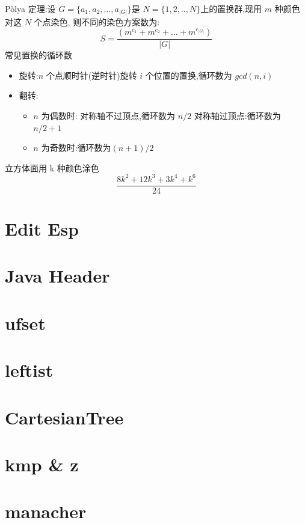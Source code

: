 \documentclass[
	10pt,
	twocolumn,
	a4paper,
]{article}
\begin{document}
Pòlya 定理:设 $G=\{a_1, a_2, ..., a_{|G|}\}$是 $N=\{1,2,..,N\}$上的置换群,现用 $m$ 种颜色对这 $N$ 个点染色, 则不同的染色方案数为:
$$S = \frac{(m^{c_1}+m^{c_2}+ \ldots + m^{c_{|G|}})}{|G|}$$
常见置换的循环数
\begin{itemize}
	\item 旋转:$n$ 个点顺时针(逆时针)旋转 $i$ 个位置的置换,循环数为 $gcd(n, i)$ 
	\item 翻转:
	\begin{itemize}
		\item $n$ 为偶数时: 对称轴不过顶点,循环数为 $n/2$ 对称轴过顶点:循环数为 $n/2+1$
		\item $n$ 为奇数时:循环数为$(n+1)/2$
	\end{itemize}
\end{itemize}
立方体面用 k 种颜色涂色
$$ \frac{8k^2 + 12 k^3 + 3 k^4 + k^6}{24} $$

\section{Edit Esp}

\section{Java Header}


\section{ufset}

\section{leftist}

\section{CartesianTree}

\section{kmp \& z}

%
\section{manacher}

\end{document}
